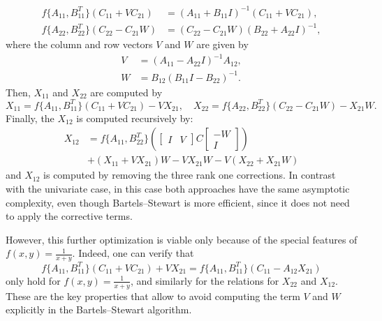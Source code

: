 \documentclass{siamart1116}
\begin{document}
    \begin{align*}
     f\{A_{11}, B_{11}^T\}(C_{11} + VC_{21})&=(A_{11}+B_{11}I)^{-1}(C_{11}+VC_{21}),\\
   f\{A_{22}, B_{22}^T\}(C_{22}-C_{21}W)&=(C_{22}-C_{21}W)(B_{22}+A_{22}I)^{-1},
\end{align*}
where the column and row vectors $V$ and $W$ are given by
\begin{align*}
    V&=(A_{11}-A_{22}I)^{-1}A_{12},\\
    W&=B_{12}(B_{11}I-B_{22})^{-1}.
\end{align*}
Then, $X_{11}$ and $X_{22}$ are computed by
\[
  X_{11} = f\{A_{11},B_{11}^T\}(C_{11} + VC_{21}) - VX_{21}, \quad 
  X_{22} = f\{A_{22}, B_{22}^T\}(C_{22}-C_{21}W) - X_{21} W.
\]
Finally, the $X_{12}$ is computed recursively by:
\begin{align*}
X_{12} &= f\{A_{11},B_{22}^T\}\left(\begin{bmatrix}
	I& V
	\end{bmatrix}C \begin{bmatrix}
	-W\\ I
	\end{bmatrix}\right) \\
	&+(X_{11}+VX_{21})W -VX_{21}W- V(X_{22}+X_{21}W) 
\end{align*}
and $X_{12}$ is computed by removing the three rank one corrections.
In contrast with the univariate case, in this case both approaches have 
the same asymptotic complexity, even though Bartels--Stewart is more
efficient, since it does not need to apply the corrective terms. 

However, this further optimization is viable only because of the special
features of $f(x,y) = \frac{1}{x+y}$. Indeed, 
one can verify that 
\[
  f\{ A_{11}, B_{11}^T \}(C_{11} + VC_{21}) + V X_{21} = 
    f\{ A_{11}, B_{11}^T \} (C_{11} - A_{12} X_{21})
\]
only hold for $f(x,y) = \frac{1}{x+y}$, and similarly for the 
relations for $X_{22}$ and $X_{12}$. These are the key properties 
that allow to avoid computing the term $V$ and $W$ explicitly in the Bartels--Stewart algorithm.
\end{document}

